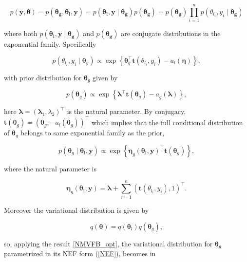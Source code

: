 \begin{equation}
    p(\bm{y},\bm{\theta}) = p(\bm{\theta_g},\bm{\theta_l},\bm{y})   = p(\bm{\theta_{l}},\bm{y}\mid \bm{\theta_g})p(\bm{\theta_g}) = p(\bm{\theta_g})\prod_{i=1}^{n}p(\theta_{l_i},y_i\mid\bm{\theta_g})
\end{equation}

where both $p(\bm{\theta_{l}},\bm{y}\mid \bm{\theta_g})$ and $p(\bm{\theta_g})$ are conjugate distributions in the exponential family. Specifically

\begin{equation}
    p(\theta_{l_i},y_i\mid\bm{\theta}_g)\propto\exp{\left\lbrace\bm{\theta}_g^\top\bm{t}(\theta_{l_i},y_i)-a_l(\bm{\eta})\right\rbrace},
\end{equation}

with prior distribution for $\bm{\theta}_g$ given by

\begin{equation}
    p(\bm{\theta}_g)\propto\exp{\left\lbrace\bm{\lambda}^\top\bm{t}(\bm{\theta}_g)-a_g(\bm{\lambda})\right\rbrace},
\end{equation}

here $\bm{\lambda}=(\bm{\lambda}_{1},\lambda_{2})^\top$ is the natural parameter. By conjugacy, $\bm{t}(\bm{\theta}_g) = (\bm{\theta}_g,-a_l(\bm{\theta}_g))^\top$ which implies that the full conditional distribution of $\bm{\theta}_g$ belongs to same exponential family as the prior,

\begin{equation}
    p(\bm{\theta}_g \mid \bm{\theta_l},\bm{y} ) \propto \exp{\left\lbrace\bm{\eta}_g(\bm{\theta_l},\bm{y})^\top\bm{t}(\bm{\theta}_g)\right\rbrace},
\end{equation}

where the natural parameter is

\begin{equation}
    \bm{\eta}_g(\bm{\theta_l},\bm{y})=\bm{\lambda}+\sum_{i=1}^{n}(\bm{t}\left(\theta_{l_i},y_i\right),1)^\top.
\end{equation}

\vspace{0.5cm}

Moreover the variational distribution is given by

\begin{equation}
    q(\bm{\theta})=q(\bm{\theta}_l)q(\bm{\theta}_g),
\end{equation}

so, applying the result \ref{NMVFB_opt}, the variational distribution for $\bm{\theta}_g$ parametrized in its NEF form (\ref{NEF}), becomes in

